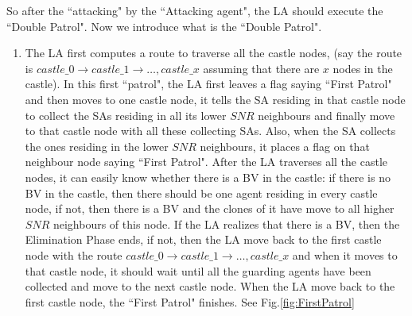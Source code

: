 So after the ``attacking" by the ``Attacking agent", the LA should execute the ``Double Patrol". Now we introduce what is the ``Double Patrol".
\begin{enumerate}
\item 
The LA first computes a route to traverse all the castle nodes, (say the route is $castle\_0\rightarrow castle\_1 \rightarrow\ldots, castle\_x$ assuming that there are $x$ nodes in the castle). In this first ``patrol", the LA first leaves a flag saying ``First Patrol" and then moves to one castle node, it tells the SA residing in that castle node to collect the SAs residing in all its lower $SNR$ neighbours and finally move to that castle node with all these collecting SAs. Also, when the SA collects the ones residing in the lower $SNR$ neighbours, it places a flag on that neighbour node saying ``First Patrol". After the LA traverses all the castle nodes, it can easily know whether there is a BV in the castle: if there is no BV in the castle, then there should be one agent residing in every castle node, if not, then there is a BV and the clones of it have move to all higher $SNR$ neighbours of this node. If the LA realizes that there is a BV, then the Elimination Phase ends, if not, then the LA move back to the first castle node with the route $castle\_0\rightarrow castle\_1 \rightarrow\ldots, castle\_x$ and when it moves to that castle node, it should wait until all the guarding agents have been collected and move to the next castle node. When the LA move back to the first castle node, the ``First Patrol" finishes. See Fig.\ref{fig:FirstPatrol}
\begin{figure} [H]
  \centering 

\end{figure}
\end{enumerate}
